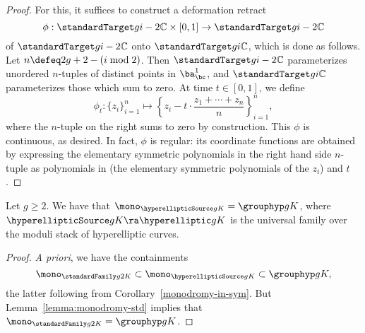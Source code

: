 \begin{proof}
For this, it suffices to construct a deformation retract 
\[
	\phi: \standardTarget g {i-2} {\mathbb C} \times [0, 1] \to \standardTarget g {i-2} {\mathbb C}
\]
of $\standardTarget g {i-2} {\mathbb C}$ onto $\standardTarget g i {\mathbb C}$, which is done as follows. Let $n \defeq 2g+2-(i \bmod 2)$. Then $\standardTarget g {i-2} {\mathbb C}$ parameterizes unordered $n$-tuples of distinct points in $\ba^1_\bc$, and $\standardTarget g i {\mathbb C}$ parameterizes those which sum to zero. At time $t \in [0, 1]$, we define 
\[
\phi_t \colon \{z_i\}_{i=1}^n \mapsto \left\{z_i - t \cdot \frac{z_1 + \cdots + z_n}{n}\right\}_{i=1}^n, 
\]
where the $n$-tuple on the right sums to zero by construction. This $\phi$ is continuous, as desired. In fact, $\phi$ is regular: its coordinate functions are obtained by expressing the elementary symmetric polynomials in the right hand side $n$-tuple as polynomials in (the elementary symmetric polynomials of the $z_i$) and $t$. 
\end{proof}

\begin{corollary}
	\label{monodromy-stack} 
	Let $g \geq 2$. We have that $\mono_{\hyperellipticSource g K} = \grouphyp g {K}$,
	where $\hyperellipticSource g K \ra \hyperelliptic g K$ is the universal family over the moduli stack of hyperelliptic curves.
\end{corollary}
\begin{proof}
\emph{A priori}, we have the containments 
\[
\mono_{\standardFamily g 2 K} \subset \mono_{\hyperellipticSource g K} \subset \grouphyp g K, 
\]
the latter following from Corollary~\ref{monodromy-in-sym}. But Lemma~\ref{lemma:monodromy-std} implies that $\mono_{\standardFamily g 2 K} = \grouphyp g K$. 
\end{proof}


